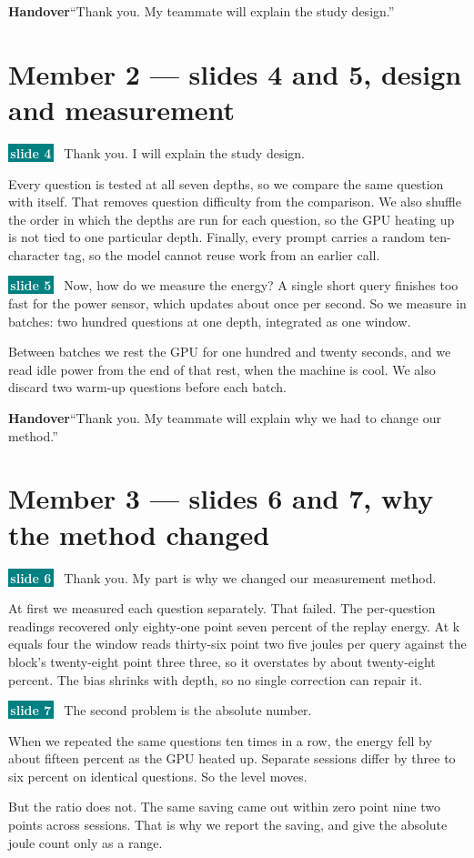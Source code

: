 \documentclass[11pt,a4paper]{article}
\newcommand{\slideref}[1]{%
  \colorbox{teal}{\textcolor{white}{\footnotesize\bfseries\,#1\,}}\ }
\newcommand{\handover}[1]{%
  \begin{handbox}%
  {\color{amber}\bfseries Handover}\enspace #1%
  \end{handbox}}
\begin{document}
\handover{``Thank you. My teammate will explain the study design.''}

\section{Member 2 \textnormal{\small --- slides 4 and 5, design and measurement}}

\begin{scriptbox}
\slideref{slide 4} Thank you. I will explain the study design.

Every question is tested at all seven depths, so we compare the same question with itself. That removes question difficulty from the comparison. We also shuffle the order in which the depths are run for each question, so the GPU heating up is not tied to one particular depth. Finally, every prompt carries a random ten-character tag, so the model cannot reuse work from an earlier call.

\slideref{slide 5} Now, how do we measure the energy? A single short query finishes too fast for the power sensor, which updates about once per second. So we measure in batches: two hundred questions at one depth, integrated as one window.

Between batches we rest the GPU for one hundred and twenty seconds, and we read idle power from the end of that rest, when the machine is cool. We also discard two warm-up questions before each batch.
\end{scriptbox}

\handover{``Thank you. My teammate will explain why we had to change our method.''}

\section{Member 3 \textnormal{\small --- slides 6 and 7, why the method changed}}

\begin{scriptbox}
\slideref{slide 6} Thank you. My part is why we changed our measurement method.

At first we measured each question separately. That failed. The per-question readings recovered only eighty-one point seven percent of the replay energy. At k equals four the window reads thirty-six point two five joules per query against the block's twenty-eight point three three, so it overstates by about twenty-eight percent. The bias shrinks with depth, so no single correction can repair it.

\slideref{slide 7} The second problem is the absolute number.

When we repeated the same questions ten times in a row, the energy fell by about fifteen percent as the GPU heated up. Separate sessions differ by three to six percent on identical questions. So the level moves.

But the ratio does not. The same saving came out within zero point nine two points across sessions. That is why we report the saving, and give the absolute joule count only as a range.
\end{scriptbox}
\end{document}
